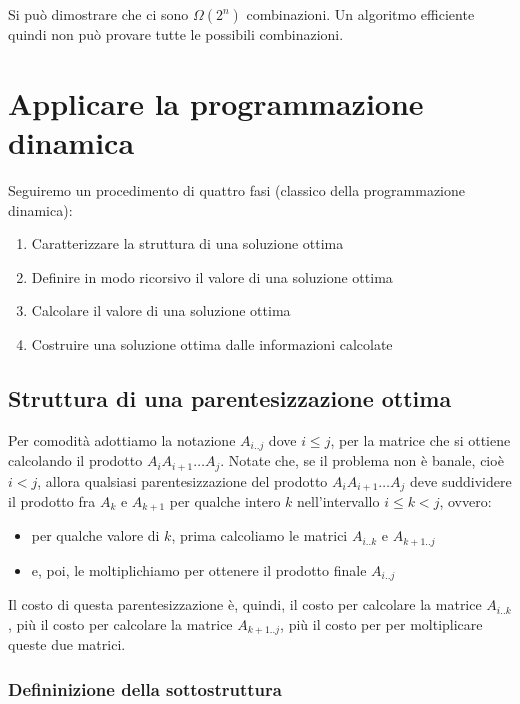 Si può dimostrare che ci sono $\Omega(2^n)$ combinazioni.
Un algoritmo efficiente quindi non può provare tutte le possibili
combinazioni.

\section{Applicare la programmazione dinamica}

Seguiremo un procedimento di quattro fasi (classico della programmazione
dinamica):
\begin{enumerate}
  \item Caratterizzare la struttura di una soluzione ottima
  \item Definire in modo ricorsivo il valore di una soluzione ottima
  \item Calcolare il valore di una soluzione ottima
  \item Costruire una soluzione ottima dalle informazioni calcolate
\end{enumerate}

\subsection{Struttura di una parentesizzazione ottima}

Per comodità adottiamo la notazione $A_{i..j}$ dove $i \le j$, per
la matrice che si ottiene calcolando il prodotto
$A_i A_{i+1} \ldots A_j$. Notate che, se il problema non è banale, cioè
$i < j$, allora qualsiasi parentesizzazione del prodotto
$A_i A_{i+1} \ldots A_j$ deve suddividere il prodotto fra $A_k$ e
$A_{k+1}$ per qualche intero $k$ nell'intervallo $i \le k < j$,
ovvero:
\begin{itemize}
  \item per qualche valore di $k$, prima calcoliamo le matrici
        $A_{i..k}$ e $A_{k+1..j}$
  \item e, poi, le moltiplichiamo per ottenere
        il prodotto finale $A_{i..j}$
\end{itemize}

Il costo di questa parentesizzazione è, quindi, il costo per calcolare
la matrice $A_{i..k}$, più il costo per calcolare la matrice
$A_{k+1..j}$, più il costo per per moltiplicare queste due matrici.


\subsubsection{Defininizione della sottostruttura}

